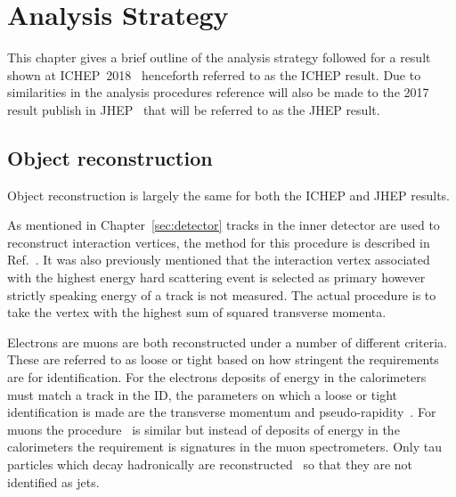 \chapter{Analysis Strategy}%
\label{sec:analysis}

This chapter gives a brief outline of the analysis strategy followed for a result shown at
ICHEP~2018~\cite{ATLAS-CONF-2018-036} henceforth referred to as the ICHEP result. Due to similarities
in the analysis procedures reference will also be made to the 2017 result publish in
JHEP~\cite{Hbb2017:ATLAS} that will be referred to as the JHEP result.

\section{Object reconstruction}

Object reconstruction is largely the same for both the ICHEP and JHEP results.

As mentioned in Chapter~\ref{sec:detector} tracks in the inner detector are used to reconstruct
interaction vertices, the method for this procedure is described in Ref.~\cite{ATLAS:vertex-reco}.
It was also previously mentioned that the interaction vertex associated with the highest energy
hard scattering event is selected as primary however strictly speaking energy of a track is not
measured. The actual procedure is to take the vertex with the highest sum of squared transverse
momenta.

Electrons are muons are both reconstructed under a number of different criteria. These
are referred to as loose or tight based on how stringent the requirements are for identification.
For the electrons deposits of energy in the calorimeters must match a track in the ID, the
parameters on which a loose or tight identification is made are the transverse momentum and
pseudo-rapidity~\cite{ATLAS:electron-reco:2016, ATLAS:electron-reco:2012}. For muons the
procedure~\cite{ATLAS:muon-reco:2016} is similar but instead of deposits of energy in the calorimeters
the requirement is signatures in the muon spectrometers. Only tau particles which decay hadronically
are reconstructed~\cite{ATLAS:tau-reco:2016, ATLAS:tau-reco:2017} so that they are not identified as
jets.

